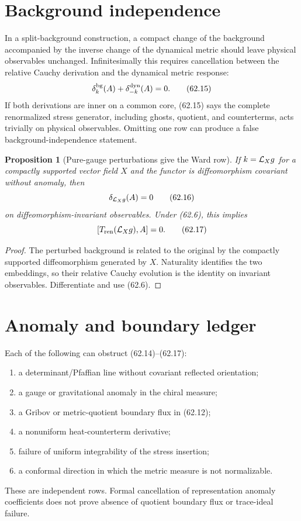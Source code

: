 \documentclass[11pt]{article}
\newtheorem{proposition}[theorem]{Proposition}
\theoremstyle{remark}
\begin{document}
\section{Background independence}

In a split-background construction, a compact change of the
background accompanied by the inverse change of the dynamical
metric should leave physical observables unchanged.  Infinitesimally
this requires cancellation between the relative Cauchy derivation
and the dynamical metric response:
\[
 \delta_k^{\rm bg}(A)+\delta_{-k}^{\rm dyn}(A)=0.        \tag{62.15}
\]
If both derivations are inner on a common core, (62.15) says the
complete renormalized stress generator, including ghosts, quotient,
and counterterms, acts trivially on physical observables.  Omitting
one row can produce a false background-independence statement.

\begin{proposition}[Pure-gauge perturbations give the Ward row]
\label{prop:v15v62-pure-gauge}
If \(k={\cal L}_Xg\) for a compactly supported vector field \(X\)
and the functor is diffeomorphism covariant without anomaly, then
\[
 \delta_{{\cal L}_Xg}(A)=0                              \tag{62.16}
\]
on diffeomorphism-invariant observables.  Under (62.6), this implies
\[
 [T_{\rm ren}({\cal L}_Xg),A]=0.                        \tag{62.17}
\]
\end{proposition}

\begin{proof}
The perturbed background is related to the original by the
compactly supported diffeomorphism generated by \(X\).  Naturality
identifies the two embeddings, so their relative Cauchy evolution
is the identity on invariant observables.  Differentiate and use
(62.6).
\end{proof}

\section{Anomaly and boundary ledger}

Each of the following can obstruct (62.14)--(62.17):
\begin{enumerate}
\item a determinant/Pfaffian line without covariant reflected
      orientation;
\item a gauge or gravitational anomaly in the chiral measure;
\item a Gribov or metric-quotient boundary flux in (62.12);
\item a nonuniform heat-counterterm derivative;
\item failure of uniform integrability of the stress insertion;
\item a conformal direction in which the metric measure is not
      normalizable.
\end{enumerate}
These are independent rows.  Formal cancellation of representation
anomaly coefficients does not prove absence of quotient boundary
flux or trace-ideal failure.
\end{document}
